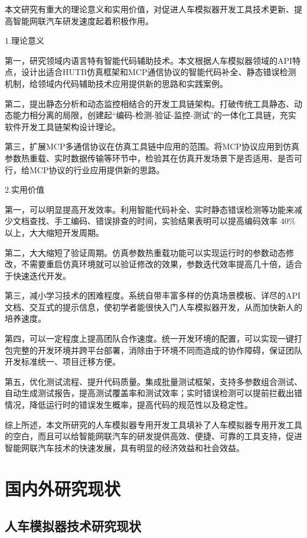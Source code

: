 本文研究有重大的理论意义和实用价值，对促进人车模拟器开发工具技术更新、提高智能网联汽车研发速度起着积极作用。

1.理论意义

第一，研究领域内语言特有智能代码辅助技术。本文根据人车模拟器领域的API特点，设计出适合HUTB仿真框架和MCP通信协议的智能代码补全、静态错误检测机制，给领域内代码辅助技术应用提供新的思路和实践案例。

第二，提出静态分析和动态监控相结合的开发工具链架构。打破传统工具静态、动态能力相分离的局限，创建起``编码-检测-验证-监控-测试''的一体化工具链，充实软件开发工具链架构设计理论。

第三，扩展MCP多通信协议在仿真工具链中应用的范围。将MCP协议应用到仿真参数热重载、实时数据传输等环节中，检验其在仿真开发场景下是否适用、是否可行，给MCP协议的行业应用提供新的思路。

2.实用价值

第一，可以明显提高开发效率。利用智能代码补全、实时静态错误检测等功能来减少文档查找、手工编码、错误排查的时间，实验结果表明可以提高编码效率
40\% 以上，大大缩短开发周期。

第二，大大缩短了验证周期。仿真参数热重载功能可以实现运行时的参数动态修改，不需要重启仿真环境就可以验证修改的效果，参数迭代效率提高几十倍，适合于快速迭代开发。

第三，减小学习技术的困难程度。系统自带丰富多样的仿真场景模板、详尽的API文档、交互式的提示信息，使初学者能很快入门人车模拟器开发，从而加快新人的培养速度。

第四，可以一定程度上提高团队合作速度。统一开发环境的配置，可以实现一键打包完整的开发环境并跨平台部署，消除由于环境不同而造成的协作障碍，保证团队开发标准统一、项目迁移方便。

第五，优化测试流程、提升代码质量。集成批量测试框架，支持多参数组合测试、自动生成测试报告，提高测试覆盖率和测试效率；实时错误检测可以提前拦截出错情况，降低运行时的错误发生概率，提高代码的规范性以及稳定性。

综上所述，本文所研究的人车模拟器专用开发工具填补了人车模拟器专用开发工具的空白，而且可以给智能网联汽车的研发提供高效、便捷、可靠的工具支持，促进智能网联汽车技术的快速发展，具有明显的经济效益和社会效益。

\section{国内外研究现状}

\subsection{人车模拟器技术研究现状}

